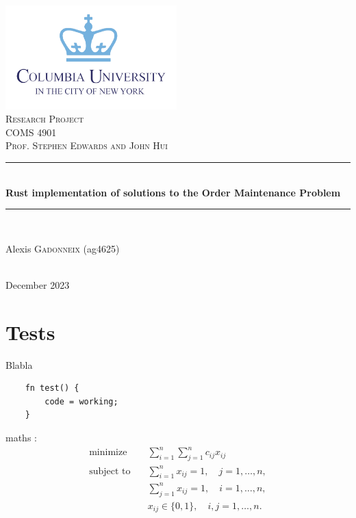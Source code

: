 \documentclass[12pt]{article}
\begin{document}
\begin{titlepage}

	\newcommand{\HRule}{\rule{\linewidth}{0.5mm}}

	\center

	\includegraphics[width=250px, keepaspectratio]{./columbia-logo.png}\\[1cm]
	\textsc{\Large Research Project}\\[0.5cm]
	\textsc{\large COMS 4901}\\[0.3cm]
	\textsc{\large Prof. Stephen Edwards and John Hui}\\[0.5cm]

	\HRule \\[0.4cm]
	{ \huge \bfseries Rust implementation of solutions to the Order Maintenance Problem}\\[0.4cm]
	\HRule \\[1.5cm]

	\begin{minipage}{0.4\textwidth}
		\begin{center} \large
			Alexis \textsc{Gadonneix} (ag4625)\\
		\end{center}

	\end{minipage}\\[2cm]

	{\large December 2023}\\[2cm]

	\vfill

\end{titlepage}

\section{Tests}

Blabla

\begin{lstlisting}
	fn test() {
		code = working;
	}
\end{lstlisting}

maths :
\begin{equation}
	\begin{aligned}
		\text{minimize} \quad   & \sum_{i=1}^{n} \sum_{j=1}^{n} c_{ij} x_{ij}       \\
		\text{subject to} \quad & \sum_{i=1}^{n} x_{ij} = 1, \quad j = 1, \dots, n, \\
		                        & \sum_{j=1}^{n} x_{ij} = 1, \quad i = 1, \dots, n, \\
		                        & x_{ij} \in \{0, 1\}, \quad i,j = 1, \dots, n.
	\end{aligned}
\end{equation}
\end{document}
